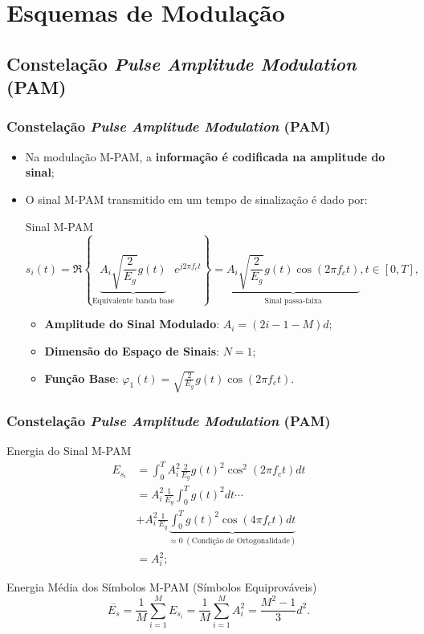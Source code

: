 \documentclass{beamer}
\newcommand{\pag}[1] {\begin{frame}#1\end{frame}}
\begin{document}
\section{Esquemas de Modulação}
\subsection{Constelação \textit{Pulse Amplitude Modulation} (PAM)}
\pag{
	\frametitle{Constelação \textit{Pulse Amplitude Modulation} (PAM)}
	\begin{itemize}
		\item	Na modulação M-PAM, a \textbf{informação é codificada na amplitude do sinal};
		\item 	O sinal M-PAM transmitido em um tempo de sinalização é dado por:
		\begin{block}{Sinal M-PAM}
			\begin{equation}
				s_{i}(t) = \Re\left\{\underbrace{A_{i}\sqrt{\frac{2}{E_{g}}}g(t)}_{\text{Equivalente banda base}}e^{j2\pi f_{c}t}\right\} = \underbrace{A_{i}\sqrt{\frac{2}{E_{g}}}g(t)\cos( 2\pi f_{c} t )}_{\text{Sinal passa-faixa}}, t \in [0,T],
			\end{equation}
			\vspace{-0.5cm}
				\begin{itemize}
					\item \textbf{Amplitude do Sinal Modulado}: $A_{i} = ( 2i - 1 - M)d$;
					\item \textbf{Dimensão do Espaço de Sinais}: $N = 1$;
					\item \textbf{Função Base}: $\varphi_{1}(t) = \sqrt{\frac{2}{E_{g}}}g(t)\cos( 2\pi f_{c} t )$.
				\end{itemize}
		\end{block}
	\end{itemize}
}

\pag{
	\frametitle{Constelação \textit{Pulse Amplitude Modulation} (PAM)}
	\begin{block}{Energia do Sinal M-PAM}
		\begin{equation}
			\begin{aligned}
				E_{s_{i}} &= \int_{0}^{T} A_{i}^{2}\frac{2}{E_{g}}g(t)^2 \cos^2( 2\pi f_{c} t ) dt \\
				&= A_{i}^{2}\frac{1}{E_{g}}\int_{0}^{T} g(t)^2 dt \cdots \\
				&+ A_{i}^{2}\frac{1}{E_{g}}\underbrace{\int_{0}^{T} g(t)^2\cos( 4\pi f_{c} t ) dt}_{\approx 0 \;(\text{Condição de Ortogonalidade})} \\
				&= A_{i}^2;
			\end{aligned}
		\end{equation}
	\end{block}
	\begin{block}{Energia Média dos Símbolos M-PAM (Símbolos Equiprováveis)}
		\begin{equation}
			\bar{E_{s}} = \frac{1}{M}\sum_{i = 1}^{M}E_{s_{i}} =  \frac{1}{M}\sum_{i = 1}^{M} A_{i}^2 = \frac{M^2 - 1}{3}d^2.
		\end{equation}
	\end{block}		
}
\end{document}
